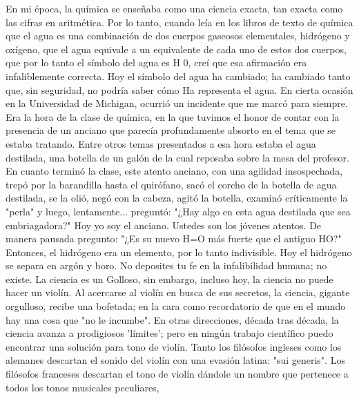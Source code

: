 En mi época, la química se enseñaba como una ciencia exacta, tan exacta como las cifras en aritmética. Por lo tanto, cuando leía en los libros de texto de química que el agua es una combinación de dos cuerpos gaseosos elementales, hidrógeno y oxígeno, que el agua equivale a un equivalente de cada uno de estos dos cuerpos,
que por lo tanto el símbolo del agua es H 0, creí que esa afirmación era infaliblemente correcta. Hoy el símbolo del agua ha cambiado; ha cambiado tanto que, sin seguridad, no podría saber 
cómo Ha representa el agua.
En cierta ocasión en la Universidad de Michigan, ocurrió un incidente que me marcó para siempre. Era la hora de la clase de química, en la que tuvimos el honor de contar con la presencia de un anciano que parecía profundamente absorto en el tema que se estaba tratando. Entre otros temas presentados a esa hora estaba el agua destilada, una botella de un galón de la cual reposaba sobre la mesa del profesor. En cuanto terminó la clase, este atento anciano, con una agilidad insospechada, trepó por la barandilla hasta el quirófano, sacó el corcho de la botella de agua destilada, se la olió, negó con la cabeza, agitó la botella, examinó críticamente la "perla" y luego, lentamente...
preguntó: "¿Hay algo en esta agua destilada que sea embriagadora?" Hoy yo soy el anciano. Ustedes son los jóvenes atentos.
De manera pausada pregunto: "¿Es su nuevo H=O más fuerte que el antiguo HO?"
Entonces, el hidrógeno era un elemento, por lo tanto indivisible. Hoy el hidrógeno se separa en argón y boro. No deposites tu fe en la infalibilidad humana; no existe. La ciencia es un Golloso, sin embargo, incluso hoy, la ciencia no puede hacer un violín. Al acercarse al violín en busca de sus secretos, la ciencia, gigante orgulloso, recibe una bofetada; en la cara como recordatorio de que en el mundo hay una cosa que "no le incumbe". En otras direcciones, década tras década, la ciencia avanza a prodigiosos 'límites'; pero en ningún trabajo científico puedo encontrar una solución para
tono de violín.
Tanto los filósofos ingleses como los alemanes descartan el sonido del violín con una evasión latina: "sui generis".
Los filósofos franceses descartan el tono de violín dándole un nombre que pertenece a todos los tonos musicales peculiares,

